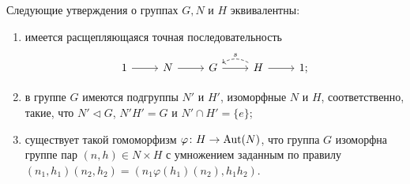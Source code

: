 
\begin{theorem}
	Следующие утверждения о группах $ G, N $ и $ H $ эквивалентны:
	\begin{enumerate}
		\item имеется расщепляющаяся точная последовательность
		$$ \begin{tikzcd}
		1 \ar{r}{} & N \ar{r} & G \ar{r} & H \ar{r} \ar[dashed, bend right=30]{l}[above]{s} & 1;
		\end{tikzcd} $$
		
		\item в группе $ G $ имеются подгруппы $ N' $ и $ H' $, изоморфные $ N $ и $ H $, соответственно, 
		такие, что $ N' \lhd G $, $ N'H' = G $ и $ N' \cap H' = \{e\} $;
		
		\item существует такой гомоморфизм $ \varphi \colon H \to \mathrm{Aut}(N) $,
		что группа $ G $ изоморфна группе пар $ (n, h) \in N \times H $ с умножением заданным по правилу
		$ (n_1, h_1)(n_2, h_2) = (n_1 \varphi(h_1)(n_2), h_1h_2) $. 
	\end{enumerate}
\end{theorem}


